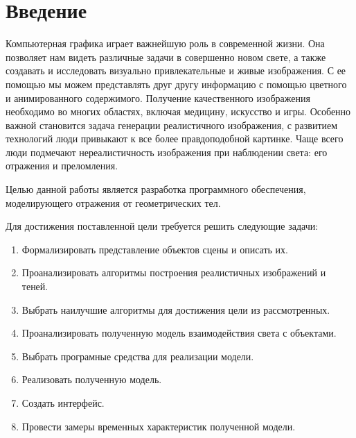 \chapter{Введение}

Компьютерная графика играет важнейшую роль в современной жизни. 
Она позволяет нам видеть различные задачи в совершенно новом свете, а также создавать и исследовать визуально привлекательные и живые изображения.
С ее помощью мы можем представлять друг другу информацию с помощью цветного и анимированного содержимого. 
Получение качественного изображения необходимо во многих областях, включая медицину, искусство и игры.
Особенно важной становится задача генерации реалистичного изображения, с развитием технологий люди привыкают к все более
правдоподобной картинке. Чаще всего люди подмечают нереалистичность изображения при наблюдении света: его отражения и преломления.


Целью данной работы является разработка программного обеспечения, моделирующего отражения от геометрических тел.

Для достижения поставленной цели требуется решить следующие задачи:
\begin{enumerate}
	\item Формализировать представление объектов сцены и описать их.
	\item Проанализировать алгоритмы построения реалистичных изображений и теней.
	\item Выбрать наилучшие алгоритмы для достижения цели  из рассмотренных.
	\item Проанализировать полученную  модель взаимодействия света с объектами.
	\item Выбрать програмные средства для реализации модели.
	\item Реализовать полученную модель.
	\item Создать интерфейс.
	\item Провести замеры временных характеристик полученной модели.
\end{enumerate}
